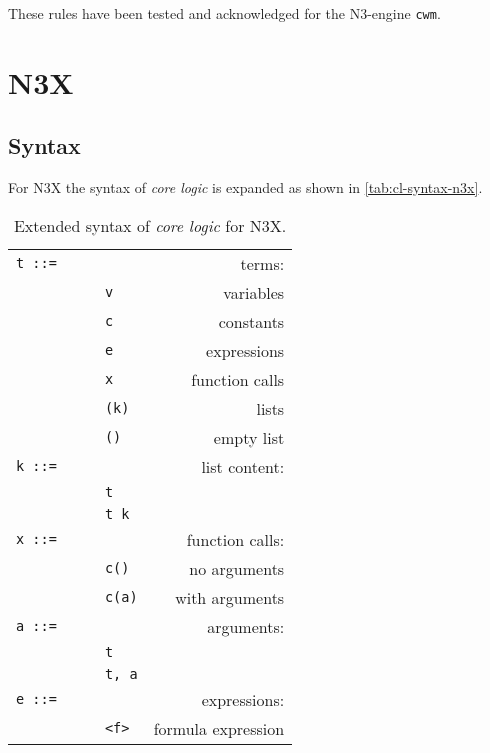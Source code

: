\documentclass[runningheads]{llncs}
\begin{document}
\noindent These rules have been tested and acknowledged for the N3-engine \texttt{cwm}.



\section{N3X}
\label{sec:n3x}



\subsection{Syntax}
\label{sec:n3x-syntax}

For N3X the syntax of \emph{core logic} is expanded as shown in \autoref{tab:cl-syntax-n3x}.

\begin{table}
  \centering
  \caption{Extended syntax of \emph{core logic} for N3X.}
  \label{tab:cl-syntax-n3x}
  \begin{tabular}{llr}
    \toprule
    \texttt{t ::=}$\qquad$ &  & terms: \\
      & \texttt{v}            & variables \\
      & \texttt{c}            & constants \\
      & \texttt{e}            & expressions \\
      & \texttt{x}            & function calls \\
      & \texttt{(k)}          & lists \\
      & \texttt{()}           & empty list \\[0.5cm]
    \texttt{k ::=} &          & list content: \\
      & \texttt{t}            & \\
      & \texttt{t k}          & \\[0.5cm]
    \texttt{x ::=} &          & function calls: \\
      & \texttt{c()}          & no arguments \\
      & \texttt{c(a)}         & with arguments \\[0.5cm]
    \texttt{a ::=} &          & arguments: \\
      & \texttt{t}            & \\
      & \texttt{t, a}         & \\[0.5cm]
    \texttt{e ::=} &          & expressions: \\
      & \texttt{<f>}          & formula expression \\

\end{tabular}
\end{table}
\end{document}
